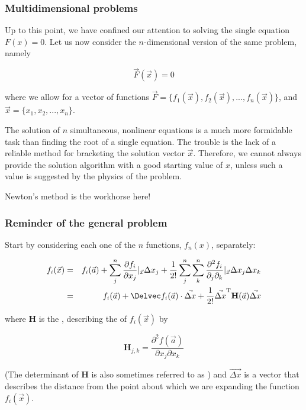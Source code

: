 \documentclass[hyperref={colorlinks=true}]{beamer}
\begin{document}
\begin{frame}%
  \frametitle{Multidimensional problems}

  Up to this point, we have confined our attention to solving the single equation $F(x) = 0$. Let us now consider the $n$-dimensional version of the same problem, namely
  
  \begin{equation}
    \vec{F}(\vec{x}) = 0
  \end{equation}

  where we allow for a vector of functions $\vec{F} = \{f_1(\vec{x}), f_2(\vec{x}), ..., f_n(\vec{x})\}$, and $\vec{x} = \{ x_1, x_2, ..., x_{n} \}$.
  
  \mysp
  
  The solution of $n$ simultaneous, nonlinear equations is a much more formidable task than finding the root of a single equation. The trouble is the lack of a reliable method for bracketing the solution vector $\vec{x}$. Therefore, we cannot always provide the solution algorithm with a good starting value of $x$, unless such a value is suggested by the physics of the problem.
  
  \mysp
  
  Newton's method is the workhorse here!
  

\end{frame}


\begin{frame}%
  \frametitle{Reminder of the general problem}

  Start by considering each one of the $n$ functions, $f_n(x)$, separately:

  \begin{eqnarray}
    f_i(\vec{x}) &=& f_i(\vec{a} )+ \sum_j^n \frac{\partial f_i}{\partial x_j}|_{\vec{x}} \Delta x_j + \frac{1}{2!} \sum_j^n \sum_k^n \frac{\partial^2 f_i}{\partial_j \partial_k}|_{\vec{x}} \Delta x_j \Delta x_k \\
                 &=& f_i(\vec {a} )+ \Delvec f_i(\vec{a}) \cdot \vec{\Delta x} + \frac{1}{2!}\vec{\Delta x}^{\mathrm {T} }\mathbf {H} (\vec{a})\vec{\Delta x}
  \end{eqnarray}
  
  where $\mathbf {H}$ is the , describing the  of $f_i(\vec{x})$ by
  
  \begin{equation}
    {\mathbf {H} }_{j,k}={\frac {\partial ^{2}f(\vec{a})}{\partial x_{j}\partial x_{k}}}
  \end{equation}
  
  (The determinant of $\mathbf {H}$ is also sometimes referred to as ) and $\vec{\Delta x}$ is a vector that describes the distance from the point about which we are expanding the function $f_i(\vec{x})$.

\end{frame}
\end{document}
